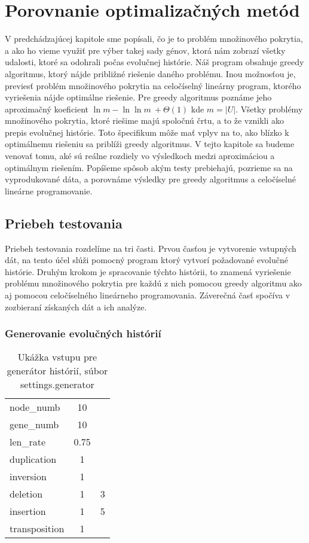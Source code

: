 \chapter{Porovnanie optimalizačných metód}
V predchádzajúcej kapitole sme popísali, čo je to problém množinového pokrytia, a
ako ho vieme využiť pre výber takej sady génov, ktorá nám zobrazí všetky udalosti, ktoré sa odohrali počas evolučnej histórie.
Náš program obsahuje greedy algoritmus, ktorý nájde približné riešenie daného problému.
Inou možnosťou je, previesť problém množinového pokrytia na celočíselný lineárny program, ktorého vyriešenia nájde optimálne riešenie.
Pre greedy algoritmus poznáme jeho aproximačný koeficient \(\ln m - \ln \ln m\ +\Theta(1) \) \cite{Slavik} 
kde \(m = |U|\). 
Všetky problémy množinového pokrytia, ktoré riešime majú spoločnú črtu, a to že vznikli ako prepis evolučnej histórie.
Toto špecifikum môže mať vplyv na to, ako blízko k optimálnemu riešeniu sa priblíži greedy algoritmus.
V tejto kapitole sa budeme venovať tomu, aké sú reálne rozdiely vo výsledkoch medzi aproximáciou a optimálnym riešením.
Popíšeme spôsob akým testy prebiehajú, pozrieme sa na vyprodukované dáta, a porovnáme výsledky pre greedy algoritmus a celočíselné lineárne programovanie.

\section{Priebeh testovania}
Priebeh testovania rozdelíme na tri časti. 
Prvou časťou je vytvorenie vstupných dát, na tento účel slúži pomocný program ktorý vytvorí požadované evolučné histórie.
Druhým krokom je spracovanie týchto histórii, to znamená vyriešenie problému množinového pokrytia pre každú z nich pomocou 
greedy algoritmu ako aj pomocou celočíselného lineárneho programovania. Záverečná časť spočíva v zozbieraní získaných dát a ich analýze.
\subsection{Generovanie evolučných histórií}
\label{sub:generovanie}

\begin{table}[!htb]

\begin{center}
\begin{tabular}{lcl}
node\_numb & 10 & \\
gene\_numb & 10 & \\
len\_rate & 0.75 & \\
duplication & 1 & \\ 
inversion & 1 & \\ 
deletion & 1 & 3 \\ 
insertion & 1 & 5 \\ 
transposition & 1 & \\
\end{tabular}
\end{center}
\caption{Ukážka vstupu pre generátor histórií, súbor settings.generator}\label{tab:generator}
\end{table}

